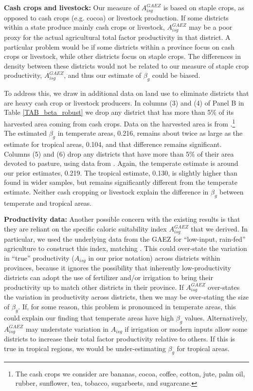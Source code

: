 \documentclass[11pt]{article}
\begin{document}
\vspace{.5cm}\noindent\textbf{Cash crops and livestock:} Our measure of $A_{isg}^{GAEZ}$ is based on staple crops, as opposed to cash crops (e.g. cocoa) or livestock production. If some districts within a state produce mainly cash crops or livestock, $A_{isg}^{GAEZ}$ may be a poor proxy for the actual agricultural total factor productivity in that district. A particular problem would be if some districts within a province focus on cash crops or livestock, while other districts focus on staple crops. The differences in density between these districts would not be related to our measure of staple crop productivity, $A_{isg}^{GAEZ}$, and thus our estimate of $\beta_g$ could be biased. 

To address this, we draw in additional data on land use to eliminate districts that are heavy cash crop or livestock producers. In columns (3) and (4) of Panel B in Table \ref{TAB_beta_robust} we drop any district that has more than 5\% of its harvested area coming from cash crops. Data on the harvested area is from \cite{mrf2008}.\footnote{The cash crops we consider are bananas, cocoa, coffee, cotton, jute, palm oil, rubber, sunflower, tea, tobacco, sugarbeets, and sugarcane.} The estimated $\beta_g$ in temperate areas, 0.216, remains about twice as large as the estimate for tropical areas, 0.104, and that difference remains significant. Columns (5) and (6) drop any districts that have more than 5\% of their area devoted to pasture, using data from \cite{remf2008}. Again, the temperate estimate is around our prior estimates, 0.219. The tropical estimate, 0.130, is slightly higher than found in wider samples, but remains significantly different from the temperate estimate. Neither cash cropping or livestock explain the difference in $\beta_g$ between temperate and tropical areas.

\vspace{.5cm}\noindent\textbf{Productivity data:} Another possible concern with the existing results is that they are reliant on the specific caloric suitability index $A_{isg}^{GAEZ}$ that we derived. In particular, we used the underlying data from the GAEZ for ``low-input, rain-fed'' agriculture to construct this index, matching \cite{galorozak2016}. This could over-state the variation in ``true'' productivity ($A_{isg}$ in our prior notation) across districts within provinces, because it ignores the possibility that inherently low-productivity districts can adopt the use of fertilizer and/or irrigation to bring their productivity up to match other districts in their province. If $A_{isg}^{GAEZ}$ over-states the variation in productivity across districts, then we may be over-stating the size of $\beta_g$. If, for some reason, this problem is pronounced in temperate areas, this could explain our finding that temperate areas have high $\beta_g$ values. Alternatively, $A_{isg}^{GAEZ}$ may understate variation in $A_{isg}$ if irrigation or modern inputs allow some districts to increase their total factor productivity relative to others. If this is true in tropical regions, we would be under-estimating $\beta_g$ for tropical areas.
\end{document}

